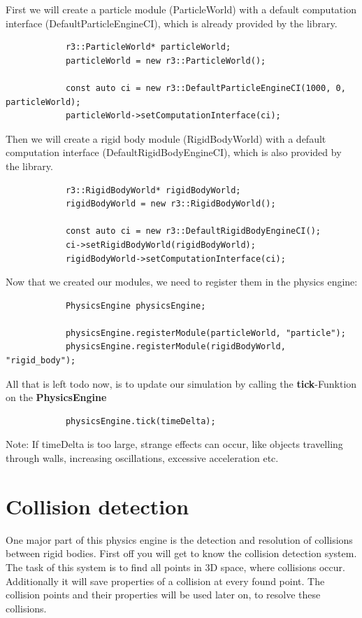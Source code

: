 \documentclass[12p, paper=a4, leqno, colorinlistoftodos]{article}
\begin{document}
		First we will create a particle module (ParticleWorld) with a default computation interface (DefaultParticleEngineCI), which is already provided by the library.
		\begin{lstlisting}
			r3::ParticleWorld* particleWorld;	
			particleWorld = new r3::ParticleWorld();
			
			const auto ci = new r3::DefaultParticleEngineCI(1000, 0, particleWorld);
			particleWorld->setComputationInterface(ci);
		\end{lstlisting}
		
		Then we will create a rigid body module (RigidBodyWorld) with a default computation interface (DefaultRigidBodyEngineCI), which is also provided by the library.
		\begin{lstlisting}
			r3::RigidBodyWorld* rigidBodyWorld;
			rigidBodyWorld = new r3::RigidBodyWorld();
			
			const auto ci = new r3::DefaultRigidBodyEngineCI();
			ci->setRigidBodyWorld(rigidBodyWorld);
			rigidBodyWorld->setComputationInterface(ci);
		\end{lstlisting}
		
		Now that we created our modules, we need to register them in the physics engine:
		\begin{lstlisting}
			PhysicsEngine physicsEngine;
		
			physicsEngine.registerModule(particleWorld, "particle");
			physicsEngine.registerModule(rigidBodyWorld, "rigid_body");
		\end{lstlisting}
		
		All that is left todo now, is to update our simulation by calling the \textbf{tick}-Funktion on the \textbf{PhysicsEngine}
		\begin{lstlisting}
			physicsEngine.tick(timeDelta);
		\end{lstlisting}
		Note: If timeDelta is too large, strange effects can occur, like objects travelling through walls, increasing oscillations, excessive acceleration etc.
	
	
	\pagebreak
	\section{Collision detection}
	One major part of this physics engine is the detection and resolution of collisions between rigid bodies. First off you will get to know the collision detection system. The task of this system is to find all points in 3D space, where collisions occur. Additionally it will save properties of a collision at every found point. The collision points and their properties will be used later on, to resolve these collisions.
		
\end{document}
